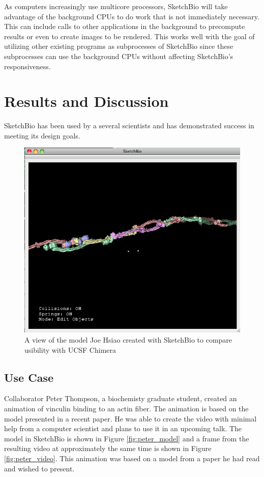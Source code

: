 \documentclass[twocolumn]{bmcart}%
\begin{document}
As computers increasingly use multicore processors, SketchBio will take advantage of the background CPUs to do work that is not immediately necessary.
This can include calls to other applications in the background to precompute results or even to create images to be rendered.
This works well with the goal of utilizing other existing programs as subprocesses of SketchBio since these subprocesses can use the background CPUs without affecting SketchBio's responsiveness.

\section*{Results and Discussion}
SketchBio has been used by a several scientists and has demonstrated success in meeting its design goals.

\begin{figure}[h]
\centering
\includegraphics[width=0.9\columnwidth]{joe_test.png}
\caption{A view of the model Joe Hsiao created with SketchBio to compare usibility with UCSF Chimera}
\label{fig:joe_test}
\end{figure}

\subsection*{Use Case}
Collaborator Peter Thompson, a biochemisty graduate student, created an animation of vinculin binding to an actin fiber.
The animation is based on the model presented in a recent paper.  He was able to create the video with minimal help from a computer scientist and plans to use it in an upcoming talk.
The model in SketchBio is shown in Figure \ref{fig:peter_model} and a frame from the resulting video at approximately the same time is shown in Figure \ref{fig:peter_video}.
This animation was based on a model from a paper he had read and wished to present.
\end{document}

